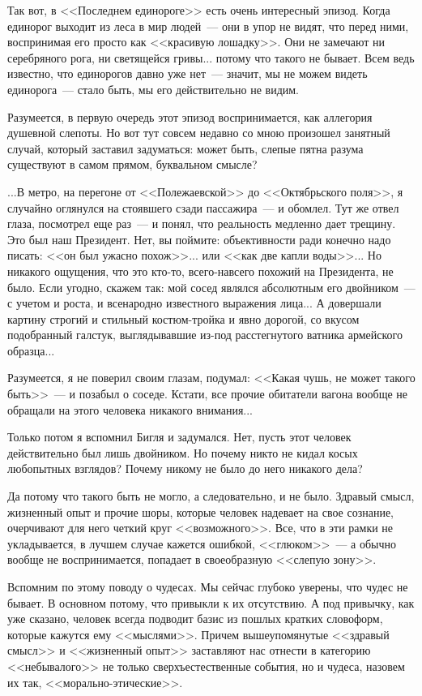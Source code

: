 \documentclass{scrbook}
\newcommand{\flqq}{<<}
\newcommand{\frqq}{>>}
\newcommand{\mdash}{~--- }
\begin{document}
Так вот, в {\flqq}Последнем единороге{\frqq} есть очень интересный эпизод. Когда единорог выходит из леса в мир людей{\mdash}они в упор не видят, что перед ними, воспринимая его просто как {\flqq}красивую лошадку{\frqq}. Они не замечают ни серебряного рога, ни светящейся гривы... потому что такого не бывает. Всем ведь известно, что единорогов давно уже нет{\mdash}значит, мы не можем видеть единорога{\mdash}стало быть, мы его действительно не видим.

Разумеется, в первую очередь этот эпизод воспринимается, как аллегория душевной слепоты. Но вот тут совсем недавно со мною произошел занятный случай, который заставил задуматься: может быть, слепые пятна разума существуют в самом прямом, буквальном смысле?

...В метро, на перегоне от {\flqq}Полежаевской{\frqq} до {\flqq}Октябрьского поля{\frqq}, я случайно оглянулся на стоявшего сзади пассажира{\mdash}и обомлел. Тут же отвел глаза, посмотрел еще раз{\mdash}и понял, что реальность медленно дает трещину. Это был наш Президент. Нет, вы поймите: объективности ради конечно надо писать: {\flqq}он был ужасно похож{\frqq}... или {\flqq}как две капли воды{\frqq}... Но никакого ощущения, что это кто-то, всего-навсего похожий на Президента, не было. Если угодно, скажем так: мой сосед являлся абсолютным его двойником{\mdash}с учетом и роста, и всенародно известного выражения лица... А довершали картину строгий и стильный костюм-тройка и явно дорогой, со вкусом подобранный галстук, выглядывавшие из-под расстегнутого ватника армейского образца...

Разумеется, я не поверил своим глазам, подумал: {\flqq}Какая чушь, не может такого быть{\frqq}{\mdash}и позабыл о соседе. Кстати, все прочие обитатели вагона вообще не обращали на этого человека никакого внимания...

Только потом я вспомнил Бигля и задумался. Нет, пусть этот человек действительно был лишь двойником. Но почему никто не кидал косых любопытных взглядов? Почему никому не было до него никакого дела?

Да потому что такого быть не могло, а следовательно, и не было. Здравый смысл, жизненный опыт и прочие шоры, которые человек надевает на свое сознание, очерчивают для него четкий круг {\flqq}возможного{\frqq}. Все, что в эти рамки не укладывается, в лучшем случае кажется ошибкой, {\flqq}глюком{\frqq}{\mdash}а обычно вообще не воспринимается, попадает в своеобразную {\flqq}слепую зону{\frqq}.

Вспомним по этому поводу о чудесах. Мы сейчас глубоко уверены, что чудес не бывает. В основном потому, что привыкли к их отсутствию. А под привычку, как уже сказано, человек всегда подводит базис из пошлых кратких словоформ, которые кажутся ему {\flqq}мыслями{\frqq}. Причем вышеупомянутые {\flqq}здравый смысл{\frqq} и {\flqq}жизненный опыт{\frqq} заставляют нас отнести в категорию {\flqq}небывалого{\frqq} не только сверхъестественные события, но и чудеса, назовем их так, {\flqq}морально-этические{\frqq}.
\end{document}
